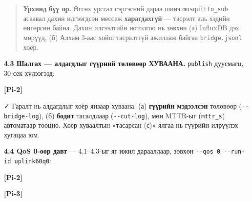 \begin{quote}
\textbf{Урхинд бүү ор.} Өгсөх урсгал сэргэсний дараа шинэ \texttt{mosquitto\_sub} асаавал дахин илгээгдсэн мессеж \textbf{харагдахгүй} --- тэсрэлт аль хэдийн өнгөрсөн байна. Дахин илгээлтийн нотолгоо нь зөвхөн (а) InfluxDB дэх мөрүүд, (б) Алхам 3-аас хойш тасралтгүй ажиллаж байгаа \texttt{bridge.jsonl} хоёр.
\end{quote}

\textbf{4.3 Шалгах --- алдагдлыг гүүрний төлөвөөр ХУВААНА.} \texttt{publish} дуусмагц, 30 сек хүлээгээд:

\textbf{{[}Pi-2{]}}

\begin{Shaded}
\begin{Highlighting}[]
  \KeywordTok{\textbackslash{}}
    \KeywordTok{\textbackslash{}}
\end{Highlighting}
\end{Shaded}

✓ Гаралт нь алдагдлыг хоёр янзаар хуваана: (а) \textbf{гүүрийн мэдээлсэн} төлөвөөр (\texttt{-\/-bridge-log}), (б) \textbf{бодит} тасалдлаар (\texttt{-\/-cut-log}), мөн MTTR-ыг (\texttt{mttr\_s}) автоматаар тооцно. Хоёр хуваалтын «тасарсан (с)» ялгаа нь гүүрийн илрүүлэх хугацаа юм.

\textbf{4.4 QoS 0-оор давт} --- 4.1--4.3-ыг яг ижил дарааллаар, зөвхөн \texttt{-\/\allowbreak{}-qos\ 0\ -\/\allowbreak{}-run-id\ uplink60q0}:

\textbf{{[}Pi-2{]}}

\begin{Shaded}
\begin{Highlighting}[]
 \KeywordTok{\textbackslash{}}
\end{Highlighting}
\end{Shaded}

\textbf{{[}Pi-3{]}}

\begin{Shaded}
\begin{Highlighting}[]
\KeywordTok{;} \KeywordTok{\&\&} 
\end{Highlighting}
\end{Shaded}

